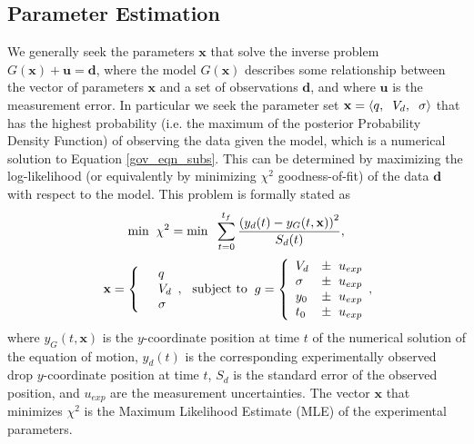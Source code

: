 \documentclass[aip,reprint, floatfix]{revtex4-1}
\begin{document}
\subsection{Parameter Estimation}
We generally seek the parameters $\mathbf{x}$ that solve the inverse problem $G(\mathbf{x}) + \mathbf{u} = \mathbf{d}$, where the model $G(\mathbf{x})$ describes some relationship between the vector of parameters $\mathbf{x}$ and a set of observations $\mathbf{d}$, and where $\mathbf{u}$ is the measurement error. In particular we seek the parameter set $\mathbf{x} = \left\langle q, \hspace{2 mm} V_d, \hspace{2 mm} \sigma \right\rangle$ that has the highest probability (i.e. the maximum of the posterior Probability Density Function) of observing the data given the model, which is a numerical solution to Equation \ref{gov_eqn_subs}. This can be determined by maximizing the log-likelihood (or equivalently by minimizing $\chi^2$ goodness-of-fit) of the data $\mathbf{d}$ with respect to the model. This problem is formally stated as  
\[
\mbox{min} \hspace{2 mm} \chi^2 = \mbox{min} \hspace{2 mm} \sum^{t_f}_{t=0} \frac{\left({y_d(t)} - y_G(t, \mathbf{x}) \right)^2}{{S_d(t)}},
\]
\begin{eqnarray*} \mbox{} \hspace{2 mm} \begin{split} \mathbf{x} = \left\{ \begin{array}{ll}      & q\\
		  &	V_d\\
          & \sigma 
          \end{array}, \right. 
          \end{split} \hspace{2 mm} \mbox{subject to} \hspace{2 mm} \begin{split}
          g = \left\{ \begin{array}{ll}
           V_d &\pm \hspace{2 mm} u_{exp}\\
      	   \sigma &\pm  \hspace{2 mm} u_{exp}\\
      	   y_0 &\pm \hspace{2 mm} u_{exp}\\
      	   t_0 &\pm \hspace{2 mm} u_{exp}\\
          \end{array}, \right. 
          \end{split}
\end{eqnarray*}
where $y_G(t, \mathbf{x})$ is the $y$-coordinate position at time $t$ of the numerical solution of the equation of motion, $y_d(t)$ is the corresponding experimentally observed drop $y$-coordinate position at time $t$, $S_d$ is the standard error of the observed position, and $u_{exp}$ are the measurement uncertainties. The vector $\mathbf{x}$ that minimizes $\chi^2$ is the Maximum Likelihood Estimate (MLE) of the experimental parameters.
\end{document}
